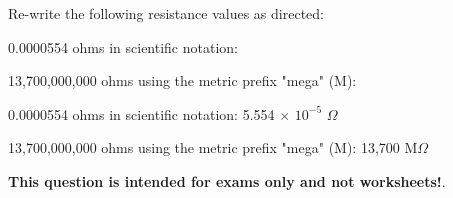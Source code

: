 

Re-write the following resistance values as directed:

\vskip 10pt

0.0000554 ohms in scientific notation: \underbar{\hskip 100pt}

\vskip 10pt

13,700,000,000 ohms using the metric prefix "mega" (M): \underbar{\hskip 100pt}







\vskip 10pt

0.0000554 ohms in scientific notation: 5.554 $\times$ $10^{-5}$ $\Omega$

\vskip 10pt

13,700,000,000 ohms using the metric prefix "mega" (M): 13,700 M$\Omega$







{\bf This question is intended for exams only and not worksheets!}.



